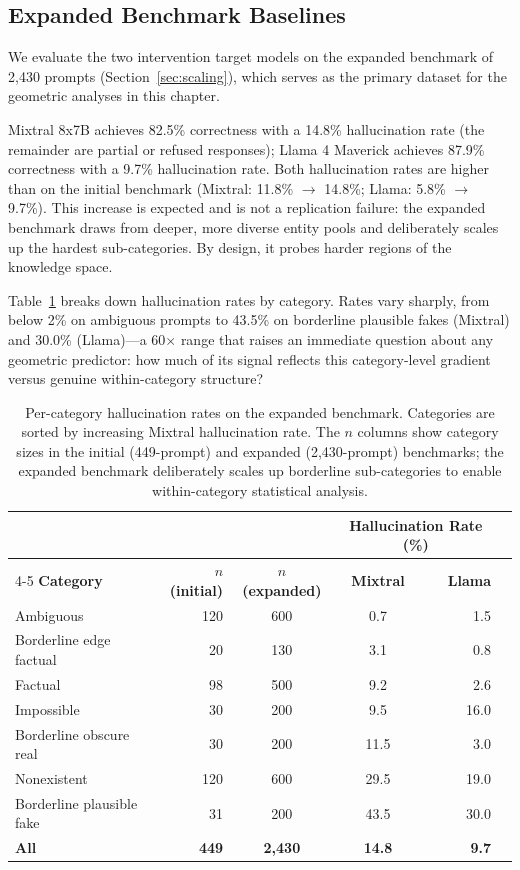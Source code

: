 \subsection{Expanded Benchmark Baselines}
\label{sec:expanded-baselines}

We evaluate the two intervention target models on the expanded benchmark of 2,430 prompts (Section~\ref{sec:scaling}), which serves as the primary dataset for the geometric analyses in this chapter.

Mixtral 8x7B achieves 82.5\% correctness with a 14.8\% hallucination rate (the remainder are partial or refused responses); Llama 4 Maverick achieves 87.9\% correctness with a 9.7\% hallucination rate. Both hallucination rates are higher than on the initial benchmark (Mixtral: 11.8\% $\rightarrow$ 14.8\%; Llama: 5.8\% $\rightarrow$ 9.7\%). This increase is expected and is not a replication failure: the expanded benchmark draws from deeper, more diverse entity pools and deliberately scales up the hardest sub-categories. By design, it probes harder regions of the knowledge space.

Table~\ref{tab:category-rates} breaks down hallucination rates by category. Rates vary sharply, from below 2\% on ambiguous prompts to 43.5\% on borderline plausible fakes (Mixtral) and 30.0\% (Llama)---a 60$\times$ range that raises an immediate question about any geometric predictor: how much of its signal reflects this category-level gradient versus genuine within-category structure?

\begin{table}[ht]
\centering
\small
\begin{tabular}{lrccrr}
\toprule
& & & \multicolumn{2}{c}{\textbf{Hallucination Rate (\%)}} \\
\cmidrule(lr){4-5}
\textbf{Category} & \textbf{$n$ (initial)} & \textbf{$n$ (expanded)} & \textbf{Mixtral} & \textbf{Llama} \\
\midrule
Ambiguous           & 120 & 600 &  0.7 &  1.5 \\
Borderline edge factual     &  20 & 130 &  3.1 &  0.8 \\
Factual             &  98 & 500 &  9.2 &  2.6 \\
Impossible          &  30 & 200 &  9.5 & 16.0 \\
Borderline obscure real     &  30 & 200 & 11.5 &  3.0 \\
Nonexistent         & 120 & 600 & 29.5 & 19.0 \\
Borderline plausible fake   &  31 & 200 & 43.5 & 30.0 \\
\midrule
\textbf{All}        & \textbf{449} & \textbf{2,430} & \textbf{14.8} & \textbf{9.7} \\
\bottomrule
\end{tabular}
\caption{Per-category hallucination rates on the expanded benchmark. Categories are sorted by increasing Mixtral hallucination rate. The $n$ columns show category sizes in the initial (449-prompt) and expanded (2,430-prompt) benchmarks; the expanded benchmark deliberately scales up borderline sub-categories to enable within-category statistical analysis.}
\label{tab:category-rates}
\end{table}

